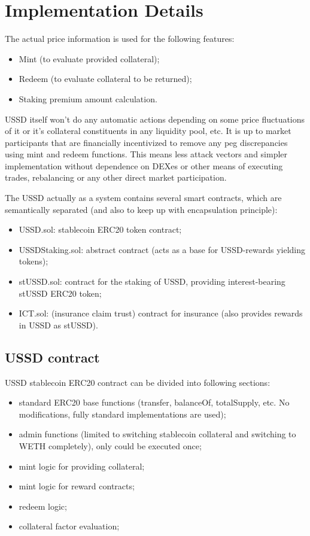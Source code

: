 \section{Implementation Details}

The actual price information is used for the following features:
\begin{itemize}
\item Mint (to evaluate provided collateral);
\item Redeem (to evaluate collateral to be returned);
\item Staking premium amount calculation.
\end{itemize}

USSD itself won't do any automatic actions depending on some price fluctuations of it or it's collateral constituents in any liquidity pool, etc. It is up to market participants that are financially incentivized to remove any peg discrepancies using mint and redeem functions. This means less attack vectors and simpler implementation without dependence on DEXes or other means of executing trades, rebalancing or any other direct market participation.

The USSD actually as a system contains several smart contracts, which are semantically separated (and also to keep up with encapsulation principle):
\begin{itemize}
\item USSD.sol: stablecoin ERC20 token contract;
\item USSDStaking.sol: abstract contract (acts as a base for USSD-rewards yielding tokens);
\item stUSSD.sol: contract for the staking of USSD, providing interest-bearing stUSSD ERC20 token;
\item ICT.sol: (insurance claim trust) contract for insurance (also provides rewards in USSD as stUSSD).
\end{itemize}

\subsection{USSD contract}

USSD stablecoin ERC20 contract can be divided into following sections:
\begin{itemize}
\item standard ERC20 base functions (transfer, balanceOf, totalSupply, etc. No modifications, fully standard implementations are used);
\item admin functions (limited to switching stablecoin collateral and switching to WETH completely), only could be executed once;
\item mint logic for providing collateral;
\item mint logic for reward contracts;
\item redeem logic;
\item collateral factor evaluation;
\end{itemize}

